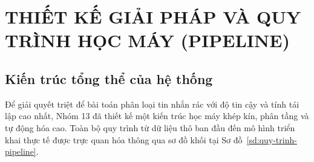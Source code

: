 \chapter{THIẾT KẾ GIẢI PHÁP VÀ QUY TRÌNH HỌC MÁY (PIPELINE)}
\label{chap:chuong3}

\section{Kiến trúc tổng thể của hệ thống}
\label{sec:kien-truc-he-thong}

Để giải quyết triệt để bài toán phân loại tin nhắn rác với độ tin cậy và tính tái lập cao nhất, Nhóm 13 đã thiết kế một kiến trúc học máy khép kín, phân tầng và tự động hóa cao. Toàn bộ quy trình từ dữ liệu thô ban đầu đến mô hình triển khai thực tế được trực quan hóa thông qua sơ đồ khối tại Sơ đồ~\ref{sd:quy-trinh-pipeline}.

